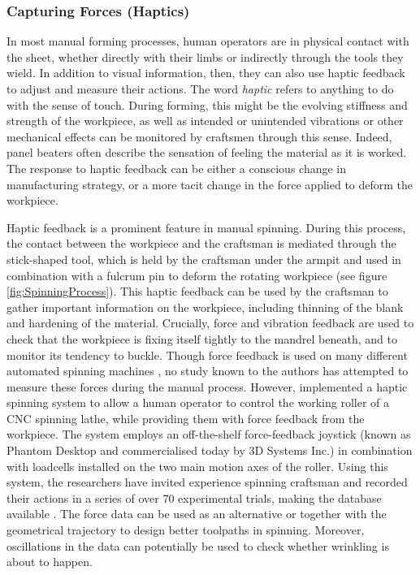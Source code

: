 \subsubsection{Capturing Forces (Haptics)}
In most manual forming processes, human operators are in physical contact with the sheet, whether directly with their limbs or indirectly through the tools they wield. In addition to visual information, then, they can also use haptic feedback to adjust and measure their actions. The word \textit{haptic} refers to anything to do with the sense of touch. During forming, this might be the evolving stiffness and strength of the workpiece, as well as intended or unintended vibrations or other mechanical effects can be monitored by craftsmen through this sense. Indeed, panel beaters often describe the sensation of feeling the material as it is worked. The response to haptic feedback can be either a conscious change in manufacturing strategy, or a more tacit change in the force applied to deform the workpiece. 

Haptic feedback is a prominent feature in manual spinning. During this process, the contact between the workpiece and the craftsman is mediated through the stick-shaped tool, which is held by the craftsman under the armpit and used in combination with a fulcrum pin to deform the rotating workpiece (see figure \ref{fig:SpinningProcess}). This haptic feedback can be used by the craftsman to gather important information on the workpiece, including thinning of the blank and hardening of the material. Crucially, force and vibration feedback are used to check that the workpiece is fixing itself tightly to the mandrel beneath, and to monitor its tendency to buckle. Though force feedback is used on many different automated spinning machines \citep{Arai2006Force-controlledMotors}, no study known to the authors has attempted to measure these forces during the manual process. However, \citep{Russo2019HapticSpinning} implemented a haptic spinning system to allow a human operator to control the working roller of a CNC spinning lathe, while providing them with force feedback from the workpiece. The system employs an off-the-shelf force-feedback joystick (known as Phantom Desktop and commercialised today by 3D Systems Inc.) in combination with loadcells installed on the two main motion axes of the roller. Using this system, the researchers have invited experience spinning craftsman and recorded their actions in a series of over 70 experimental trials, making the database available \citep{Russo2020ResearchSpinning}. The force data can be used as an alternative or together with the geometrical trajectory to design better toolpaths in spinning. Moreover, oscillations in the data can potentially be used to check whether wrinkling is about to happen. 

